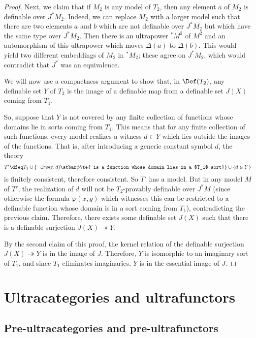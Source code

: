 \begin{proof}
Next, we claim that if $M_2$ is any model of $T_2$, then any element $a$ of $M_2$ is definable over $J^*M_2$. Indeed, we can replace $M_2$ with a larger model such that there are two elements $a$ and $b$ which are not definable over $J^* M_2$ but which have the same type over $J^*M_2$. Then there is an ultrapower $^*M^2$ of $M^2$ and an automorphism of this ultrapower which moves $\Delta(a)$ to $\Delta(b)$. This would yield two different embeddings of $M_2$ in $^*M_2$; these agree on $J^* M_2$, which would contradict that $J^*$ was an equivalence.

We will now use a compactness argument to show that, in $\Def(T_2)$, any definable set $Y$ of $T_2$ is the image of a definable map from a definable set $J(X)$ coming from $T_1$.

So, suppose that $Y$ is not covered by any finite collection of functions whose domains lie in sorts coming from $T_1$. This means that for any finite collection of such functions, every model realizes a witness $d \in Y$ which lies outside the images of the functions. That is, after introducing a generic constant symbol $d$, the theory
$$
T' \dfeq T_2 \cup \{\neg \exists r \phi(r, d) \stbar \phi \te{ is a function whose domain lies in a $T_1$-sort}\} \cup \{d \in Y\}
$$
is finitely consistent, therefore consistent. So $T'$ has a model. But in any model $M$ of $T'$, the realization of $d$ will not be $T_2$-provably definable over $J^* M$ (since otherwise the formula $\varphi(x,y)$ which witnesses this can be restricted to a definable function whose domain is in a sort coming from $T_1$), contradicting the previous claim. Therefore, there exists some definable set $J(X)$ such that there is a definable surjection $J(X) \twoheadrightarrow Y$.

By the second claim of this proof, the kernel relation of the definable surjection $J(X) \twoheadrightarrow Y$ is in the image of $J$. Therefore, $Y$ is isomorphic to an imaginary sort of $T_1$, and since $T_1$ eliminates imaginaries, $Y$ is in the essential image of $J$.
  \end{proof}

\section{Ultracategories and ultrafunctors}


\subsection{Pre-ultracategories and pre-ultrafunctors}

